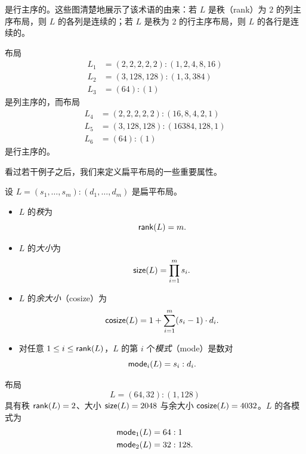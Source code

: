 \begin{example}
\begin{centering}

\end{centering}

\bigskip

\noindent 是行主序的。这些图清楚地展示了该术语的由来：若 $L$ 是秩（rank）为 $2$ 的列主序布局，则 $L$ 的各列是连续的；若 $L$ 是秩为 $2$ 的行主序布局，则 $L$ 的各行是连续的。

\end{example}

\begin{example}
布局
    \begin{align*}
    L_1 & = (2,2,2,2,2):(1,2,4,8,16)\\
    L_2 & = (3,128,128):(1,3,384)\\
    L_3 & = (64):(1)
    \end{align*}
    是列主序的，而布局
    \begin{align*}
    L_4 & = (2,2,2,2,2):(16,8,4,2,1)\\
    L_5 & = (3,128,128):(16384,128,1)\\
    L_6 & = (64):(1)
    \end{align*}
    是行主序的。
\end{example}

看过若干例子之后，我们来定义扁平布局的一些重要属性。

\begin{definition}\label{definitionofcosize} 设 $L = (s_1,\dots,s_m):(d_1,\dots,d_m)$ 是扁平布局。
\begin{itemize}
\item $L$ 的{\it 秩}为
\[\mathsf{rank}(L) = m.\]
\item $L$ 的{\it 大小}为
    \[
    \mathsf{size}(L) = \prod_{i=1}^m s_i.
    \]
\item $L$ 的{\it 余大小}（cosize）为
    \[
    \mathsf{cosize}(L) = 1 + \sum_{i=1}^m (s_i-1) \cdot d_i.
    \]
    \item 对任意 $1 \leq i \leq \mathsf{rank}(L)$，$L$ 的第 $i$ 个{\it 模式}（mode）是数对
    \[
    \mathsf{mode}_i(L) = s_i:d_i.
    \]
\end{itemize}
\end{definition}


\begin{example}
    布局
    \[L = (64,32):(1,128)\]
    具有秩 $\mathsf{rank}(L) = 2$、大小 $\mathsf{size}(L) = 2048$ 与余大小 $\mathsf{cosize}(L) = 4032$。$L$ 的各模式为
    \begin{align*} \mathsf{mode}_1(L) & = 64:1\\
    \mathsf{mode}_2(L) & =  32:128.
    \end{align*}
\end{example}


